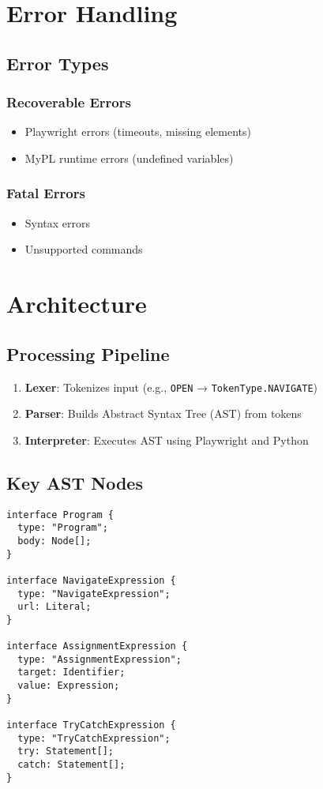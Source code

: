 \documentclass[11pt]{article}
\begin{document}
\section{Error Handling}
\label{sec:orgde90bbc}
\subsection{Error Types}
\label{sec:org6c4d84f}
\subsubsection{Recoverable Errors}
\label{sec:orgdf62134}
\begin{itemize}
\item Playwright errors (timeouts, missing elements)
\item MyPL runtime errors (undefined variables)
\end{itemize}
\subsubsection{Fatal Errors}
\label{sec:org443d843}
\begin{itemize}
\item Syntax errors
\item Unsupported commands
\end{itemize}
\section{Architecture}
\label{sec:org6afe8d5}

\subsection{Processing Pipeline}
\label{sec:org8f9425c}
\begin{enumerate}
\item \textbf{Lexer}: Tokenizes input (e.g., \texttt{OPEN} → \texttt{TokenType.NAVIGATE})
\item \textbf{Parser}: Builds Abstract Syntax Tree (AST) from tokens
\item \textbf{Interpreter}: Executes AST using Playwright and Python
\end{enumerate}
\subsection{Key AST Nodes}
\label{sec:org2dc8b85}
\begin{verbatim}
interface Program {
  type: "Program";
  body: Node[];
}

interface NavigateExpression {
  type: "NavigateExpression";
  url: Literal;
}

interface AssignmentExpression {
  type: "AssignmentExpression";
  target: Identifier;
  value: Expression;
}

interface TryCatchExpression {
  type: "TryCatchExpression";
  try: Statement[];
  catch: Statement[];
}
\end{verbatim}
\end{document}
